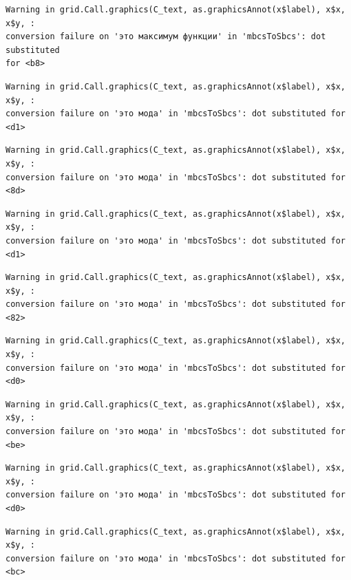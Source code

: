 \documentclass[
  letterpaper,
  DIV=11,
  numbers=noendperiod]{scrreprt}
\theoremstyle{definition}
\theoremstyle{remark}
\begin{document}
\begin{verbatim}
Warning in grid.Call.graphics(C_text, as.graphicsAnnot(x$label), x$x, x$y, :
conversion failure on 'это максимум функции' in 'mbcsToSbcs': dot substituted
for <b8>
\end{verbatim}

\begin{verbatim}
Warning in grid.Call.graphics(C_text, as.graphicsAnnot(x$label), x$x, x$y, :
conversion failure on 'это мода' in 'mbcsToSbcs': dot substituted for <d1>
\end{verbatim}

\begin{verbatim}
Warning in grid.Call.graphics(C_text, as.graphicsAnnot(x$label), x$x, x$y, :
conversion failure on 'это мода' in 'mbcsToSbcs': dot substituted for <8d>
\end{verbatim}

\begin{verbatim}
Warning in grid.Call.graphics(C_text, as.graphicsAnnot(x$label), x$x, x$y, :
conversion failure on 'это мода' in 'mbcsToSbcs': dot substituted for <d1>
\end{verbatim}

\begin{verbatim}
Warning in grid.Call.graphics(C_text, as.graphicsAnnot(x$label), x$x, x$y, :
conversion failure on 'это мода' in 'mbcsToSbcs': dot substituted for <82>
\end{verbatim}

\begin{verbatim}
Warning in grid.Call.graphics(C_text, as.graphicsAnnot(x$label), x$x, x$y, :
conversion failure on 'это мода' in 'mbcsToSbcs': dot substituted for <d0>
\end{verbatim}

\begin{verbatim}
Warning in grid.Call.graphics(C_text, as.graphicsAnnot(x$label), x$x, x$y, :
conversion failure on 'это мода' in 'mbcsToSbcs': dot substituted for <be>
\end{verbatim}

\begin{verbatim}
Warning in grid.Call.graphics(C_text, as.graphicsAnnot(x$label), x$x, x$y, :
conversion failure on 'это мода' in 'mbcsToSbcs': dot substituted for <d0>
\end{verbatim}

\begin{verbatim}
Warning in grid.Call.graphics(C_text, as.graphicsAnnot(x$label), x$x, x$y, :
conversion failure on 'это мода' in 'mbcsToSbcs': dot substituted for <bc>
\end{verbatim}
\end{document}
